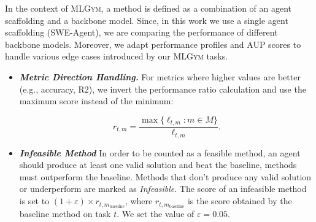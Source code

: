 \documentclass[]{fairmeta}
\newcommand{\ibold}[1]{\textbf{\textit{#1}}}
\newcommand{\nr}[1]{\colorbox{Emerald}{\textcolor{white}{Nick}}\textcolor{Emerald}{\textbf{:#1}}}
\newcommand{\mlgym}{\fontfamily{lmr}\selectfont\mdseries\textsc{MLGym}\xspace}
\begin{document}
In the context of \mlgym, a method is defined as a combination of an agent scaffolding and a backbone model.
%
Since, in this work we use a single agent scaffolding (SWE-Agent), we are comparing the performance of different backbone models.
%
Moreover, we adapt performance profiles and AUP scores to handle various edge cases introduced by our \mlgym tasks.
%

\begin{itemize}
    \item \ibold{Metric Direction Handling.} For metrics where higher values are better (e.g., accuracy, R2), we invert the performance ratio calculation and use the maximum score instead of the minimum: 

          \begin{equation}
              r_{t,m} = \frac{\max\{\ell_{t,m}: m \in M\}}{\ell_{t,m}}.
          \end{equation}

    \item \ibold{Infeasible Method} In order to be counted as a feasible method, an agent should produce at least one valid solution and beat the baseline, methods must outperform the baseline.
    Methods that don't produce any valid solution or underperform are marked as \textit{Infeasible}. 
    The score of an infeasible method is set to $(1 + \varepsilon) \times r_{t, m_{\text{baseline}}}$, where $r_{t, m_{\text{baseline}}}$ is the score obtained by the baseline method on task $t$. 
    We set the value of $\varepsilon = 0.05$.
\end{itemize}
\end{document}
